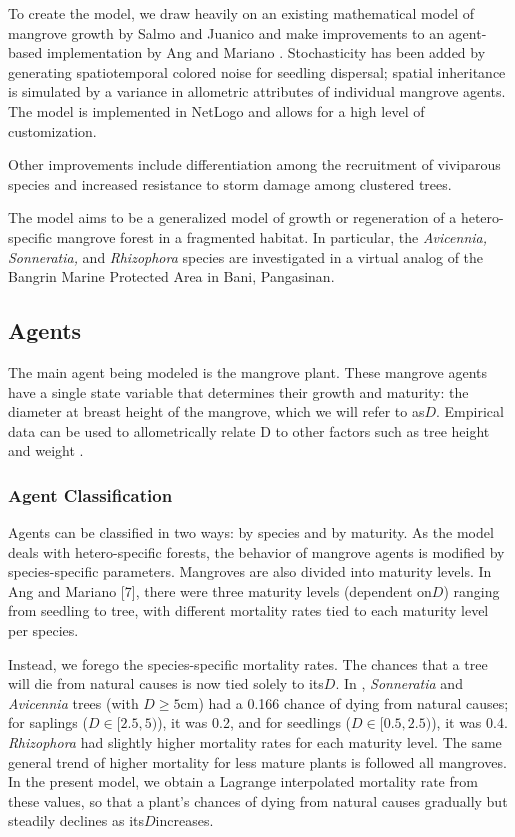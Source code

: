 To create the model, we draw heavily on an existing mathematical model
of mangrove growth by Salmo and Juanico \cite{SalmoJuanico2015} and make improvements to
an agent-based implementation by Ang and Mariano \cite{mangrovesAngMariano}. Stochasticity
has been added by generating spatiotemporal colored noise for seedling
dispersal; spatial inheritance is simulated by a variance in allometric
attributes of individual mangrove agents. The model is implemented in
NetLogo and allows for a high level of customization.

Other improvements include differentiation among the recruitment of
viviparous species and increased resistance to storm damage among
clustered trees.

The model aims to be a generalized model of growth or regeneration of a
hetero-specific mangrove forest in a fragmented habitat. In particular,
the \emph{Avicennia, Sonneratia,} and \emph{Rhizophora} species are
investigated in a virtual analog of the Bangrin Marine Protected Area in
Bani, Pangasinan.

\subsection{Agents}

The main agent being modeled is the mangrove plant. These mangrove agents
have a single state variable that determines their growth and maturity:
the diameter at breast height of the mangrove, which we will refer to
as\(D\). Empirical data can be used to allometrically relate D to other
factors such as tree height and weight \cite{Hiebeler2000}.

\subsubsection{Agent Classification}

Agents can be classified in two ways: by species and by maturity. As the
model deals with hetero-specific forests, the behavior of mangrove
agents is modified by species-specific parameters. Mangroves are also
divided into maturity levels. In Ang and Mariano {[}7{]}, there were
three maturity levels (dependent on\(D\)) ranging from seedling to tree,
with different mortality rates tied to each maturity level per species.

Instead, we forego the species-specific mortality rates. The chances
that a tree will die from natural causes is now tied solely to its\(D\).
In \cite{mangrovesAngMariano}, \emph{Sonneratia} and \emph{Avicennia} trees (with
\(D \geq 5\)cm) had a 0.166 chance of dying from natural causes; for
saplings (\(D \in \lbrack 2.5,5)\)), it was 0.2, and for seedlings
(\(D \in \lbrack 0.5,2.5)\)), it was 0.4. \emph{Rhizophora} had slightly
higher mortality rates for each maturity level. The same general trend
of higher mortality for less mature plants is followed all mangroves. In
the present model, we obtain a Lagrange interpolated mortality rate from
these values, so that a plant's chances of dying from natural causes
gradually but steadily declines as its\(D\)increases.

